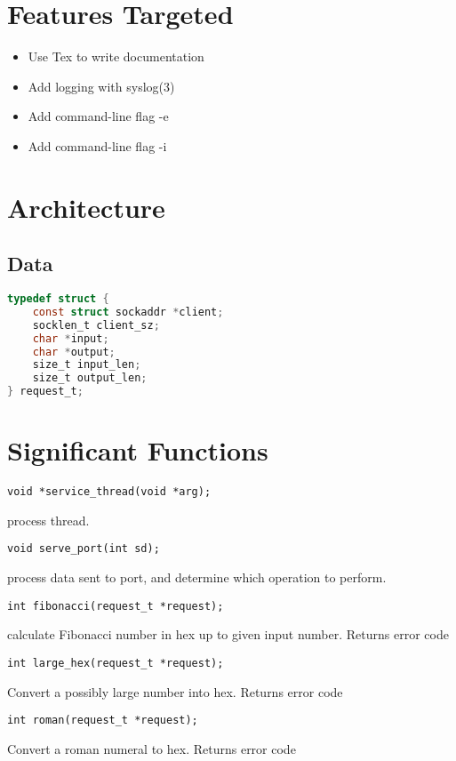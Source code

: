 \documentclass[12pt]{article}
\begin{document}
	\section{Features Targeted}
	\begin{itemize}
		\item Use Tex to write documentation
		\item Add logging with syslog(3)
		\item Add command-line flag -e
		\item Add command-line flag -i
	\end{itemize}
	\section{Architecture}
		\subsection{Data}
			\begin{lstlisting}[language=C]
typedef struct {
	const struct sockaddr *client;
	socklen_t client_sz;
	char *input;
	char *output;
	size_t input_len;
	size_t output_len;
} request_t;
			\end{lstlisting}
	\section{Significant Functions}
		\begin{lstlisting}
void *service_thread(void *arg);
		\end{lstlisting}
		process thread.

		\begin{lstlisting}
void serve_port(int sd);
		\end{lstlisting}
		process data sent to port, and determine which operation to perform.

		\begin{lstlisting}
int fibonacci(request_t *request);
		\end{lstlisting}
		calculate Fibonacci number in hex up to given input number. Returns error code

		\begin{lstlisting}
int large_hex(request_t *request);
		\end{lstlisting}
		Convert a possibly large number into hex. Returns error code

		\begin{lstlisting}
int roman(request_t *request);
		\end{lstlisting}
		Convert a roman numeral to hex. Returns error code
\end{document}
